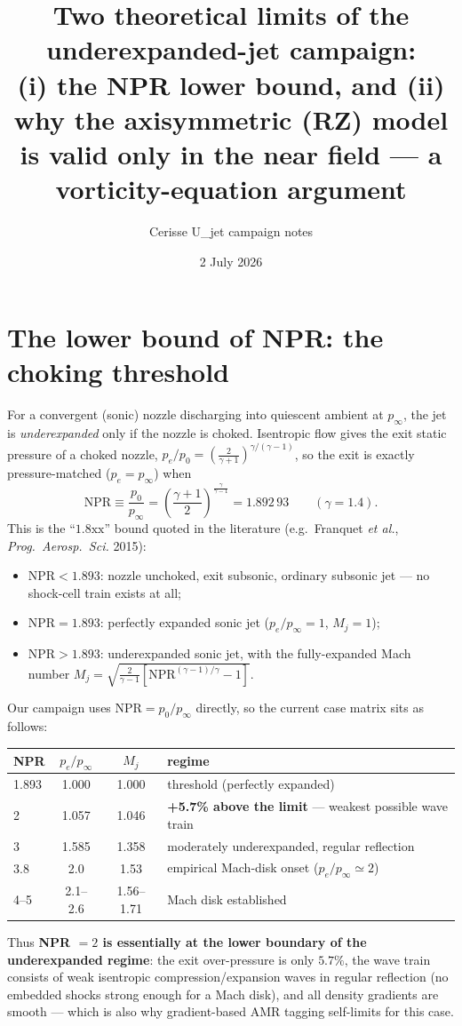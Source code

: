 \documentclass[11pt]{article}
\title{Two theoretical limits of the underexpanded-jet campaign:\\
(i) the NPR lower bound, and (ii) why the axisymmetric (RZ) model\\
is valid only in the near field --- a vorticity-equation argument}
\author{Cerisse U\_jet campaign notes}
\date{2 July 2026}
\begin{document}
\maketitle

\section{The lower bound of NPR: the choking threshold}

For a convergent (sonic) nozzle discharging into quiescent ambient at
$p_\infty$, the jet is \emph{underexpanded} only if the nozzle is
choked. Isentropic flow gives the exit static pressure of a choked
nozzle, $p_e/p_0 = \left(\tfrac{2}{\gamma+1}\right)^{\gamma/(\gamma-1)}$,
so the exit is exactly pressure-matched ($p_e = p_\infty$) when
\begin{equation}
  \mathrm{NPR} \equiv \frac{p_0}{p_\infty}
  = \left(\frac{\gamma+1}{2}\right)^{\frac{\gamma}{\gamma-1}}
  = 1.892\,93 \qquad (\gamma = 1.4).
  \label{eq:choke}
\end{equation}
This is the ``$1.8\mathrm{xx}$'' bound quoted in the literature
(e.g.\ Franquet \emph{et al.}, \emph{Prog.\ Aerosp.\ Sci.} 2015):
\begin{itemize}
\item $\mathrm{NPR} < 1.893$: nozzle unchoked, exit subsonic, ordinary
  subsonic jet --- no shock-cell train exists at all;
\item $\mathrm{NPR} = 1.893$: perfectly expanded sonic jet
  ($p_e/p_\infty = 1$, $M_j = 1$);
\item $\mathrm{NPR} > 1.893$: underexpanded sonic jet, with the
  fully-expanded Mach number
  $M_j = \sqrt{\tfrac{2}{\gamma-1}\!\left[\mathrm{NPR}^{(\gamma-1)/\gamma}-1\right]}$.
\end{itemize}

Our campaign uses $\mathrm{NPR}=p_0/p_\infty$ directly, so the current
case matrix sits as follows:
\begin{center}
\begin{tabular}{lccl}
\toprule
NPR & $p_e/p_\infty$ & $M_j$ & regime \\
\midrule
1.893 & 1.000 & 1.000 & threshold (perfectly expanded) \\
2     & 1.057 & 1.046 & \textbf{+5.7\% above the limit} --- weakest possible wave train \\
3     & 1.585 & 1.358 & moderately underexpanded, regular reflection \\
3.8   & 2.0   & 1.53  & empirical Mach-disk onset ($p_e/p_\infty \simeq 2$) \\
4--5  & 2.1--2.6 & 1.56--1.71 & Mach disk established \\
\bottomrule
\end{tabular}
\end{center}
Thus \textbf{NPR $=2$ is essentially at the lower boundary of the
underexpanded regime}: the exit over-pressure is only $5.7\%$, the
wave train consists of weak isentropic compression/expansion waves in
regular reflection (no embedded shocks strong enough for a Mach disk),
and all density gradients are smooth --- which is also why
gradient-based AMR tagging self-limits for this case.
\end{document}
